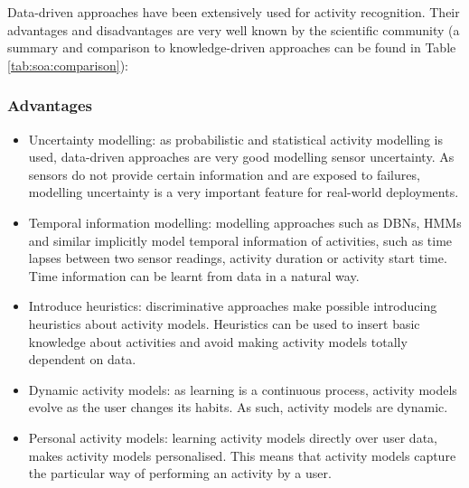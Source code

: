 Data-driven approaches have been extensively used for activity recognition. Their advantages and disadvantages are very well known by the scientific community (a summary and comparison to knowledge-driven approaches can be found in Table \ref{tab:soa:comparison}):

\subsubsection*{Advantages}
\begin{itemize}
 \item Uncertainty modelling: as probabilistic and statistical activity modelling is used, data-driven approaches are very good modelling sensor uncertainty. As sensors do not provide certain information and are exposed to failures, modelling uncertainty is a very important feature for real-world deployments.
 \item Temporal information modelling: modelling approaches such as DBNs, HMMs and similar implicitly model temporal information of activities, such as time lapses between two sensor readings, activity duration or activity start time. Time information can be learnt from data in a natural way.
 \item Introduce heuristics: discriminative approaches make possible introducing heuristics about activity models. Heuristics can be used to insert basic knowledge about activities and avoid making activity models totally dependent on data.
 \item Dynamic activity models: as learning is a continuous process, activity models evolve as the user changes its habits. As such, activity models are dynamic.
 \item Personal activity models: learning activity models directly over user data, makes activity models personalised. This means that activity models capture the particular way of performing an activity by a user.
\end{itemize}

